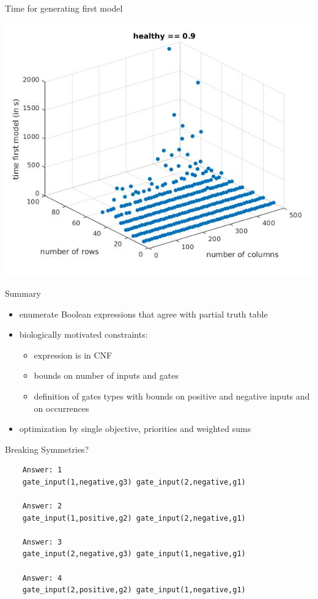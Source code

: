 \documentclass[10pt,dvipsnames]{beamer}
\begin{document}
\begin{frame}{Time for generating first model}
{\begin{center}
\includegraphics[scale=0.4]{first_healthy09.jpg}
\end{center}}
\end{frame}


\begin{frame}{Summary}
 \begin{itemize}
  \item enumerate Boolean expressions that agree with partial truth table
  \item biologically motivated constraints:
  \begin{itemize}
   \item expression is in CNF
   \item bounds on number of inputs and gates
   \item definition of gates types with bounds on positive and negative inputs and on occurrences   
  \end{itemize}
  \item optimization by single objective, priorities and weighted sums
  \end{itemize}
\end{frame}



\begin{frame}[fragile]{Breaking Symmetries?}
 \vfill
 \begin{verbatim}
    Answer: 1
    gate_input(1,negative,g3) gate_input(2,negative,g1)
    
    Answer: 2
    gate_input(1,positive,g2) gate_input(2,negative,g1)
    
    Answer: 3
    gate_input(2,negative,g3) gate_input(1,negative,g1)
    
    Answer: 4
    gate_input(2,positive,g2) gate_input(1,negative,g1)
 \end{verbatim}
\end{frame}
\end{document}
